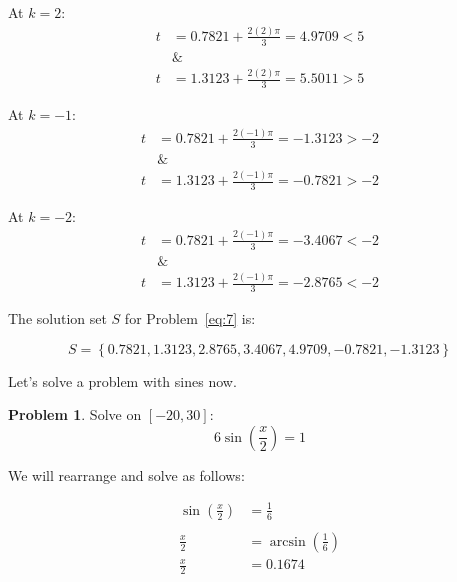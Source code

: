 \documentclass[12pt]{article}
\theoremstyle{definition}
\newtheorem{problem}{Problem}
\begin{document}
At $k=2$:
\begin{align}
    t         & = 0.7821 + \frac{2(2)\pi}{3} = 4.9709 < 5 \\
    \nonumber & \&                                        \\
    t         & = 1.3123 + \frac{2(2)\pi}{3} = 5.5011 > 5
\end{align}

At $k=-1$:
\begin{align}
    t         & = 0.7821 + \frac{2(-1)\pi}{3} = -1.3123 > -2 \\
    \nonumber & \&                                           \\
    t         & = 1.3123 + \frac{2(-1)\pi}{3} = -0.7821 > -2
\end{align}

At $k=-2$:
\begin{align}
    t         & = 0.7821 + \frac{2(-1)\pi}{3} = -3.4067 < -2 \\
    \nonumber & \&                                           \\
    t         & = 1.3123 + \frac{2(-1)\pi}{3} = -2.8765 < -2
\end{align}

The solution set $S$ for Problem~\eqref{eq:7} is:

\begin{equation}
    S = \left\{ 0.7821, 1.3123, 2.8765, 3.4067, 4.9709, -0.7821, -1.3123 \right\}
\end{equation}

Let's solve a problem with sines now.

\begin{problem}
Solve on $[-20, 30]$:
\begin{equation*}
    6\sin\left(\frac{x}{2}\right) = 1 \label{eq:8}
\end{equation*}
\end{problem}

We will rearrange and solve as follows:

\begin{align}
    \sin\left(\frac{x}{2}\right) & = \frac{1}{6}                     \\
    \nonumber                                                        \\
    \frac{x}{2}                  & = \arcsin\left(\frac{1}{6}\right) \\
    \frac{x}{2}                  & = 0.1674
\end{align}
\end{document}
